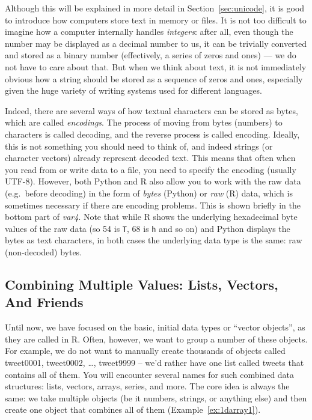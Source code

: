 Although this will be explained in more detail in Section~\ref{sec:unicode},
it is good to introduce how computers store text in memory or files. 
It is not too difficult to imagine how a computer internally
handles \emph{integers}: after all, even though the number may be displayed
as a decimal number to us, it can be trivially converted and stored
as a binary number (effectively, a series of zeros and ones)
--- we do not have to care about that.
But when we think about text, it is not
immediately obvious how a string should be stored as a sequence of
zeros and ones, especially given the huge variety of writing systems used for different languages. 

Indeed, there are several ways of how textual characters can be stored as bytes,
which are called \emph{encodings}. 
The process of moving from bytes (numbers) to characters is called decoding,
and the reverse process is called encoding. 
Ideally, this is not something you should need to think of,
and indeed strings (or character vectors) already represent decoded text.
This means that often when you read from or write data to a file,
you need to specify the encoding (usually UTF-8). 
However, both Python and R also allow you to work with the raw data
(e.g.\ before decoding) in the form of \emph{bytes} (Python) or \emph{raw} (R) data,
which is sometimes necessary if there are encoding problems.
This is shown briefly in the bottom part of \emph{var4}.
Note that while R shows the underlying hexadecimal byte values of the raw data (so 54 is \verb|T|, 68 is \verb|h| and so on) and Python 
displays the bytes as text characters, in both cases the underlying data type is the same: raw (non-decoded) bytes.



\subsection{Combining Multiple Values: Lists, Vectors, And Friends}\label{sec:collections}

Until now, we have focused on the basic, initial data types or ``vector
objects'', as they are called in R.  Often, however, we want to group
a number of these objects. For example, we do not want to manually
create thousands of objects called tweet0001, tweet0002, \ldots,
tweet9999 -- we'd rather have one list called tweets that contains all
of them. You will encounter several names for such combined data
structures: lists, vectors, arrays, series, and 
more. 
The core idea is always the same: we take multiple objects
(be it numbers, strings, or anything else) and then create one object that combines all of them (Example~\ref{ex:1darray1}).

